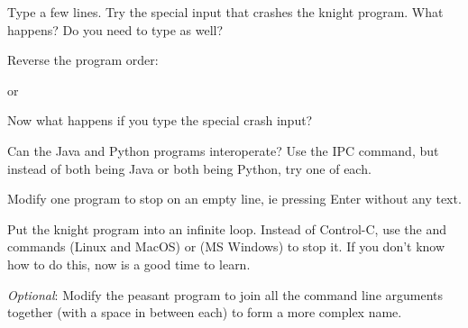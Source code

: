 Type a few lines. Try the special input that crashes the knight program. What
happens? Do you need to type  as well?

Reverse the program order:

or

Now what happens if you type the special crash input?



Can the Java and Python programs interoperate? Use the IPC command, but instead
of both being Java or both being Python, try one of each.

Modify one program to stop on an empty line, ie pressing Enter without any text.

Put the knight program into an infinite loop. Instead of Control-C, use the
 and  commands (Linux and MacOS) or 
(MS Windows) to stop it. If you don't know how to do this, now is a good time
to learn.

\emph{Optional}: Modify the peasant program to join all the command line arguments
together (with a space in between each) to form a more complex name.


\COPYRIGHT


